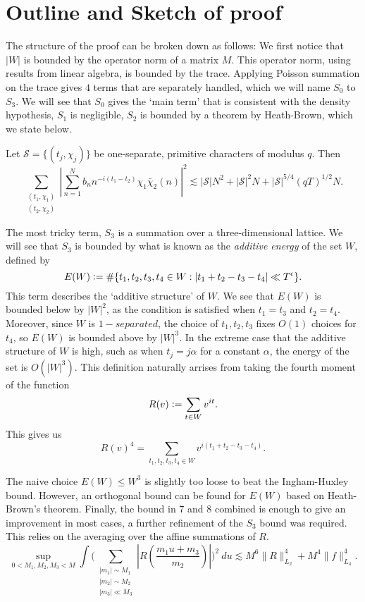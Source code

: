 \section{Outline and Sketch of proof}
The structure of the proof can be broken down as follows: We first notice that $|W|$ is bounded by the operator norm of a matrix $M$. This operator norm, using results from linear algebra, is bounded by the trace. Applying Poisson summation on the trace gives $4$ terms that are separately handled, which we will name $S_0$ to $S_3$. We will see that $S_0$ gives the `main term' that is consistent with the density hypothesis, $S_1$ is negligible, $S_2$ is bounded by a theorem by Heath-Brown, which we state below. 
\begin{theorem}
    \label{heathbrown}
    Let $\mathcal{S}=\{(t_j,\chi_j)\}$ be one-separate, primitive characters of modulus $q$. Then 
    \[
        \sum_{\substack{(t_1,\chi_1)\\(t_2,\chi_2)}}\left|\sum_{n=1}^{N} b_n n^{-i(t_1-t_2)}\chi_1\bar{\chi}_2(n)\right|^2 \lesssim  |\mathcal{S}|N^2+ |\mathcal{S}|^2N + |\mathcal{S}|^{5/4}(qT)^{1/2}N.
    \]
\end{theorem}
The most tricky term, $S_3$ is a summation over a three-dimensional lattice. We will see that $S_3$ is bounded by what is known as the \textit{additive energy} of the set $W$, defined by\[
    E(W)\mathrel{\mathop:}= \#\{t_1,t_2,t_3,t_4\in W : |t_1+t_2-t_3-t_4|\ll T^\epsilon\}.
\]
This term describes the `additive structure' of $W$.
We see that $E(W)$ is bounded below by $|W|^2$, as the condition is satisfied when $t_1=t_3$ and $t_2=t_4$. Moreover, since $W$ is $1-separated$, the choice of $t_1,t_2,t_3$ fixes $O(1)$ choices for $t_4$, so $E(W)$ is bounded above by $|W|^3$. In the extreme case that the additive structure of $W$ is high, such as when $t_j=j\alpha$ for a constant $\alpha$, the energy of the set is $O(|W|^3)$. This definition naturally arrises from taking the fourth moment of the function \[
R(v)\mathrel{\mathop:}=\sum_{t\in W} v^{it}.
\] 
This gives us \[
R(v)^4=\sum_{t_1,t_2,t_3,t_4\in W}v^{i(t_1+t_2-t_3-t_4)}.
\]

The naive choice $E(W)\leq W^3$ is slightly too loose to beat the Ingham-Huxley bound. However, an orthogonal bound can be found for $E(W)$ based on Heath-Brown's theorem. Finally, the bound in $7$ and $8$ combined is enough to give an improvement in most cases, a further refinement of the $S_3$ bound was required. This relies on the averaging over the affine summations of $R$.
 \[
        \sup_{0<M_1,M_2,M_3<M} \int\Bigg( \sum_{\substack{|m_1|\sim M_1\\|m_2|\sim M_2 \\ |m_3|\ll M_3}} \left|R\left(\frac{m_1 u+m_3}{m_2}\right)\right|\Bigg)^2 \ du \lesssim M^6 \|R\|_{L_2}^4+M^4\|f\|_{L_4}^4.
\] 

